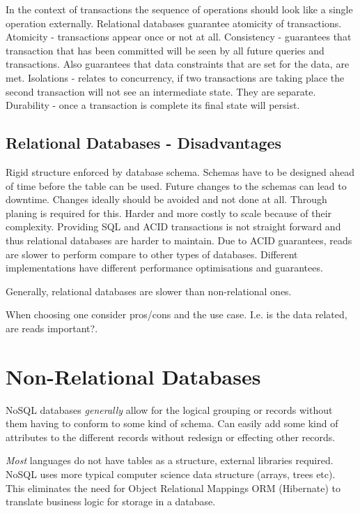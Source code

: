 In the context of transactions the sequence of operations should look like a single operation externally.
Relational databases guarantee atomicity of transactions.
Atomicity - transactions appear once or not at all.
Consistency - guarantees that transaction that has been committed will be seen by all future queries and transactions.
Also guarantees that data constraints that are set for the data, are met.
Isolations - relates to concurrency, if two transactions are taking place the second transaction will not see an intermediate state.
They are separate.
Durability - once a transaction is complete its final state will persist.

\subsection{Relational Databases - Disadvantages}
Rigid structure enforced by database schema.
Schemas have to be designed ahead of time before the table can be used.
Future changes to the schemas can lead to downtime.
Changes ideally should be avoided and not done at all.
Through planing is required for this.
Harder and more costly to scale because of their complexity.
Providing SQL and ACID transactions is not straight forward and thus relational databases are harder to maintain.
Due to ACID guarantees, reads are slower to perform compare to other types of databases.
Different implementations have different performance optimisations and guarantees.

\begin{note}
    Generally, relational databases are slower than non-relational ones.
\end{note}

When choosing one consider pros/cons and the use case.
I.e. is the data related, are reads important?.


\section{Non-Relational Databases}

NoSQL databases \textit{generally} allow for the logical grouping or records without them having to conform to some kind of schema.
Can easily add some kind of attributes to the different records without redesign or effecting other records.

\textit{Most} languages do not have tables as a structure, external libraries required.
NoSQL uses more typical computer science data structure (arrays, trees etc).
This eliminates the need for Object Relational Mappings ORM (Hibernate) to translate business logic for storage in a database.

